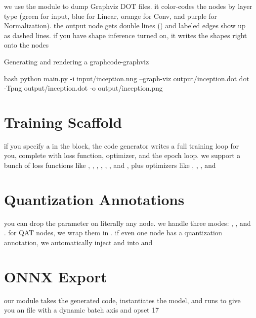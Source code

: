\documentclass{nngraph-en}
\begin{document}
we use the  module to dump Graphviz DOT files. it color-codes the nodes by layer type (green for input, blue for Linear, orange for Conv, and purple for Normalization). the output node gets double lines () and labeled edges show up as dashed lines. if you have shape inference turned on, it writes the shapes right onto the nodes

\begin{codebox}{Generating and rendering a graph}{code-graphviz}
\begin{amzcode}{bash}
python main.py -i input/inception.nng --graph-viz output/inception.dot
dot -Tpng output/inception.dot -o output/inception.png
\end{amzcode}
\end{codebox}

\section{Training Scaffold}

if you specify a  in the  block, the code generator writes a full training loop for you, complete with loss function, optimizer, and the epoch loop. we support a bunch of loss functions like , , , , , , and , plus optimizers like , , , and 

\section{Quantization Annotations}

you can drop the  parameter on literally any node. we handle three modes: , , and . for QAT nodes, we wrap them in . if even one node has a quantization annotation, we automatically inject  and  into  and 

\section{ONNX Export}

our  module takes the generated code, instantiates the model, and runs  to give you an  file with a dynamic batch axis and opset 17
\end{document}

